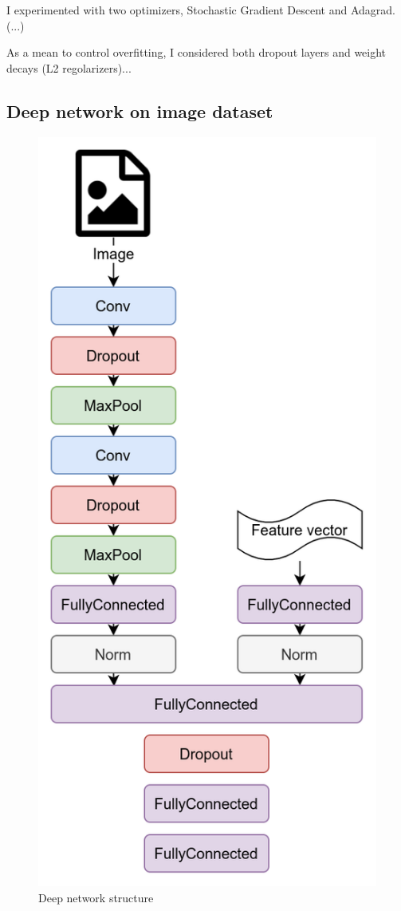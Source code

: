 \documentclass[10pt,letterpaper]{article}
\begin{document}
I experimented with two optimizers, Stochastic Gradient Descent and Adagrad. (...)

As a mean to control overfitting, I considered both dropout layers and weight decays (L2 regolarizers)...


\subsection{Deep network on image dataset}

\begin{figure}
\includegraphics[width=0.9\linewidth]{Network.png}
\caption{Deep network structure}
\end{figure}
\end{document}
